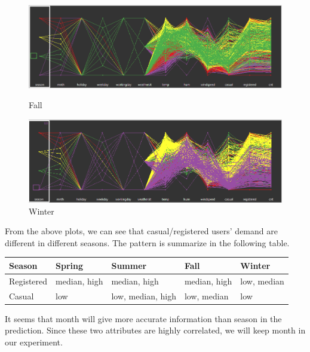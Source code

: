 \documentclass[12pt]{article}
\begin{document}
	 \begin{figure}[H]
	 	\centering
	 	\begin{minipage}{.5\textwidth}
	 		\centering
	 		\includegraphics[width=\linewidth]{figures/fall_pcor.png}
	 		\caption{Fall}
	 	\end{minipage}%
	 	\begin{minipage}{.5\textwidth}
	 		\centering
	 		\includegraphics[width=\linewidth]{figures/winter_pcor.png}
	 		\caption{Winter}
	 	\end{minipage}
	 \end{figure}
	From the above plots, we can see that casual/registered users' demand are different in different seasons. The pattern is summarize in the following table. 
	
	\begin{table}[H]
		\centering
		\begin{tabular}{|l|l|l|l|l|}
			\hline
			Season & 	Spring & Summer & Fall & Winter\\ \hline
			Registered & median, high & median, high & median, high & low, median\\
			Casual & low & low, median, high & low, median & low \\ \hline
		\end{tabular}
	\end{table}
	
	
    It seems that month will give more accurate information than season in the prediction. Since these two attributes are highly correlated, we will keep month in our experiment.	
		
\end{document}
